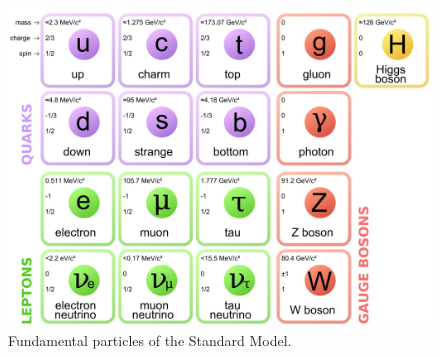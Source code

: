 \begin{figure}
\centering
\includegraphics[width=0.6\linewidth]{plots/Intro/sm.jpg}
\caption{Fundamental particles of the Standard Model.}
\label{fig:intro:sm}
\end{figure}